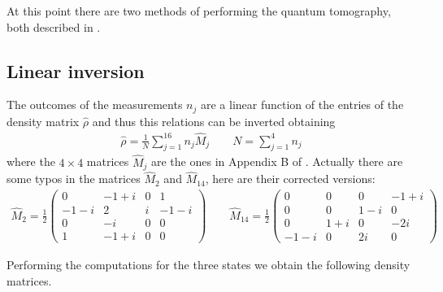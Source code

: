 \documentclass[a4paper, 11pt]{article}
\begin{document}
    At this point there are two methods of performing the quantum tomography, both described in \cite{rif:tomo}.

    \subsection{Linear inversion}
      The outcomes of the measurements $n_j$ are a linear function of the entries of the density matrix $\hat{\rho}$ and thus this relations can be inverted obtaining
      \begin{gather*}
        \hat{\rho} = \frac{1}{N}\sum_{j = 1}^{16} n_j \hat{M}_j
        \qquad N = \sum_{j = 1}^4 n_j
      \end{gather*}
      where the $4 \times 4$ matrices $\hat{M}_j$ are the ones in Appendix B of \cite{rif:tomo}. Actually there are some typos in the matrices $\hat{M}_2$ and $\hat{M}_{14}$, here are their corrected versions:
      \begin{gather*}
        \hat{M}_2 = \frac{1}{2}
        \begin{pmatrix}
          0 & -1 + i & 0 & 1 \\
          -1 - i & 2 & i & -1 -i \\
          0 & -i & 0 & 0 \\
          1 & -1 + i & 0 & 0
        \end{pmatrix}
        \qquad
        \hat{M}_{14} = \frac{1}{2}
        \begin{pmatrix}
          0 & 0 & 0 & -1 + i \\
          0 & 0 & 1 - i & 0 \\
          0 & 1 + i & 0 & -2i \\
          -1 -i & 0 & 2i & 0
        \end{pmatrix}
      \end{gather*}

      Performing the computations for the three states we obtain the following density matrices.
\end{document}
